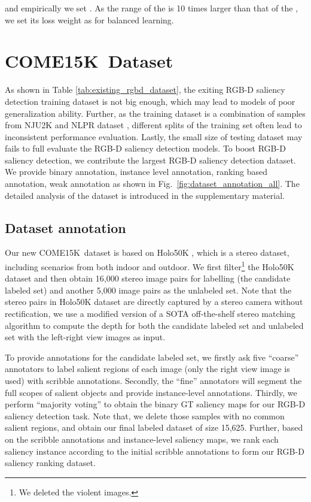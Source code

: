 \documentclass[10pt,twocolumn,letterpaper]{article}
\def\ourdataset{COME15K}
\begin{document}
and empirically we set .
As the range of the  is 10 times larger than that of the , we set its loss weight as  for balanced learning.








\section{\ourdataset~Dataset}
\label{the_new_dataset}
As shown in Table \ref{tab:existing_rgbd_dataset}, the exiting RGB-D saliency detection training dataset is not big enough, which may lead to models of poor generalization ability. Further, as the training dataset is a combination of samples from NJU2K \cite{NJU2000} and NLPR dataset \cite{peng2014rgbd}, different splits
of the training set often lead to inconsistent performance evaluation. Lastly, the small size of testing dataset may fails to full evaluate the RGB-D saliency detection models.
To boost 
RGB-D saliency detection, we contribute the largest RGB-D saliency detection dataset. We provide binary annotation, instance level annotation, ranking based annotation, weak annotation as shown in Fig.~\ref{fig:dataset_annotation_all}. The detailed analysis of the dataset is introduced in the supplementary material.



\subsection{Dataset annotation}
\label{dataset_annotation}
Our new \ourdataset~dataset is based on Holo50K \cite{hua2020holopix50k}, which is a stereo dataset, including scenarios from both indoor and outdoor. We first filter\footnote{We deleted the violent images.} the Holo50K dataset and then obtain
16,000 stereo image pairs for labelling (the candidate labeled set) and another 5,000 image pairs as the unlabeled set. Note that the stereo pairs in Holo50K dataset are directly captured by a stereo camera without rectification, we use a modified version of a SOTA off-the-shelf stereo matching algorithm \cite{zhong2020displacement} to compute the depth for both the candidate labeled set and unlabeled set with the left-right view images as input.


To provide annotations for the candidate labeled set, we firstly ask five \enquote{coarse} annotators to
label salient regions of each image (only the right view image is used) with scribble annotations.
Secondly, the \enquote{fine} annotators will segment the full scopes of salient objects and provide instance-level annotations.
Thirdly, we perform \enquote{majority voting} to obtain the binary GT saliency maps for our RGB-D saliency detection task. Note that, we delete those samples with no common salient regions, and obtain our final labeled dataset of size 15,625. 
Further, based on the scribble annotations and instance-level saliency maps, we rank each saliency instance according to the initial scribble annotations to form our RGB-D saliency ranking dataset. 
\end{document}
